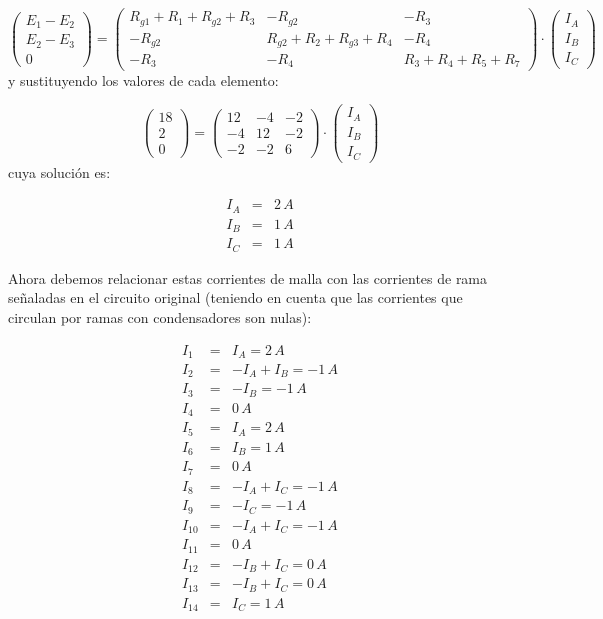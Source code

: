 \documentclass[10pt]{article}
\begin{document}
\[
\left(\begin{array}{c}
E_{1}-E_{2}\\
E_{2}-E_{3}\\
0
\end{array}\right) = \left(\begin{array}{ccc}
R_{g1}+R_{1}+R_{g2}+R_{3} & -R_{g2} & -R_{3}\\
-R_{g2} & R_{g2}+R_{2}+R_{g3}+R_{4} & -R_{4}\\
-R_{3} & -R_{4} & R_{3}+R_{4}+R_{5}+R_{7}
\end{array}\right) \cdot \left(\begin{array}{c}
I_{A}\\
I_{B}\\
I_{C}
\end{array}\right)
\]
 y sustituyendo los valores de cada elemento:

\[
\left(\begin{array}{c}
18\\
2\\
0
\end{array}\right) = \left(\begin{array}{ccc}
12 & -4 & -2\\
-4 & 12 & -2\\
-2 & -2 & 6
\end{array}\right) \cdot \left(\begin{array}{c}
I_{A}\\
I_{B}\\
I_{C}
\end{array}\right)
\]
cuya solución es:

\begin{eqnarray*}
I_{A} & = & 2\, A\\
I_{B} & = & 1\, A\\
I_{C} & = & 1\, A
\end{eqnarray*}


Ahora debemos relacionar estas corrientes de malla con las corrientes
de rama señaladas en el circuito original (teniendo en cuenta que
las corrientes que circulan por ramas con condensadores son nulas):

\begin{eqnarray*}
I_{1} & = & I_{A}=2\, A\\
I_{2} & = & -I_{A}+I_{B}=-1\, A\\
I_{3} & = & -I_{B}=-1\, A\\
I_{4} & = & 0\, A\\
I_{5} & = & I_{A}=2\, A\\
I_{6} & = & I_{B}=1\, A\\
I_{7} & = & 0\, A\\
I_{8} & = & -I_{A}+I_{C}=-1\, A\\
I_{9} & = & -I_{C}=-1\, A\\
I_{10} & = & -I_{A}+I_{C}=-1\, A\\
I_{11} & = & 0\, A\\
I_{12} & = & -I_{B}+I_{C}=0\, A\\
I_{13} & = & -I_{B}+I_{C}=0\, A\\
I_{14} & = & I_{C}=1\, A
\end{eqnarray*}
\end{document}
